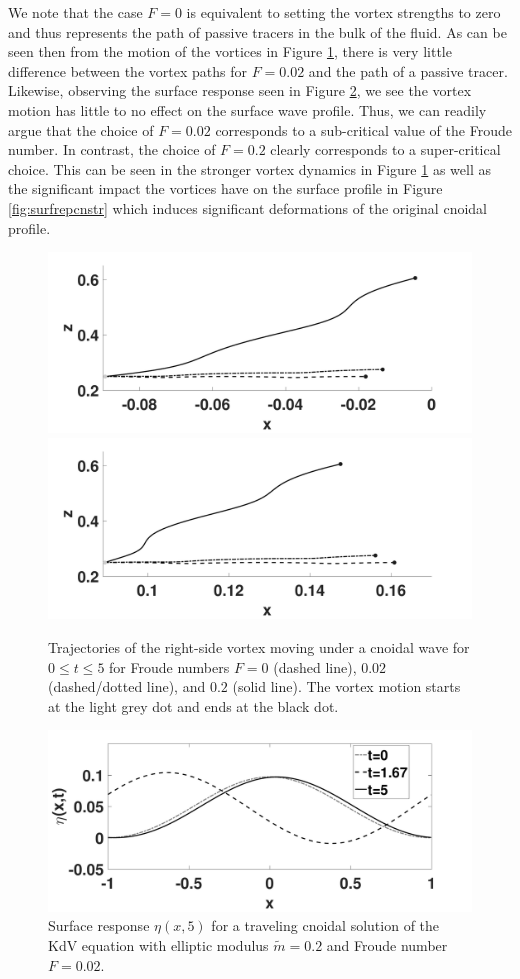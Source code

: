 \documentclass[a4paper,11pt]{article}
\begin{document}
We note that the case $F=0$ is equivalent to setting the vortex strengths to zero and thus represents the path of passive tracers in the bulk of the fluid.  As can be seen then from the motion of the vortices in Figure \ref{fig:cntrack}, there is very little difference between the vortex paths for $F=0.02$ and the path of a passive tracer.  Likewise, observing the surface response seen in Figure \ref{fig:surfrepcnwk}, we see the vortex motion has little to no effect on the surface wave profile.  Thus, we can readily argue that the choice of $F=0.02$ corresponds to a sub-critical value of the Froude number.  In contrast, the choice of $F=0.2$ clearly corresponds to a super-critical choice.  This can be seen in the stronger vortex dynamics in Figure \ref{fig:cntrack} as well as the significant impact the vortices have on the surface profile in Figure \ref{fig:surfrepcnstr} which induces significant deformations of the original cnoidal profile.   
\begin{figure}[h]
\centering
\includegraphics[width=.48\textwidth]{leftside_cnoid_tracks}
\includegraphics[width=.48\textwidth]{rightside_cnoid_tracks}
\caption{\small Trajectories of the right-side vortex moving under a cnoidal wave for $0\leq t \leq 5$ for Froude numbers $F=0$ (dashed line), $0.02$ (dashed/dotted line), and $0.2$ (solid line).  The vortex motion starts at the light grey dot and ends at the black dot.}
\label{fig:cntrack}
\end{figure}
\begin{figure}[h!]
\centering
\includegraphics[width=.6\textwidth]{surf_resp_cnoid_mu_pt2_F_pt02_tf_5NEW}
\caption{\small Surface response $\eta(x,5)$ for a traveling cnoidal solution of the KdV equation with elliptic modulus $\tilde{m}=0.2$ and Froude number $F=0.02$.}
\label{fig:surfrepcnwk}
\end{figure}
\end{document}
